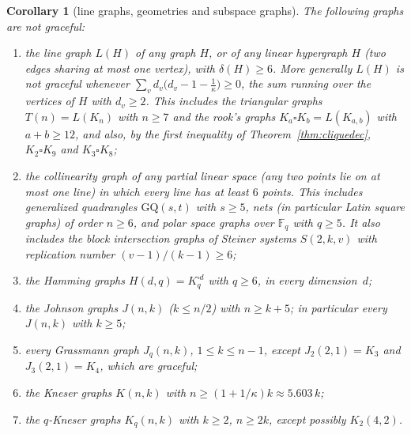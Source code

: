 \documentclass[11pt]{amsart}
\newcommand{\thmmarker}{}
\newcommand{\mnew}{\gdef\thmmarker{\textsuperscript{$\star$}}}
\theoremstyle{tplain}
\newtheorem{corollary}[theorem]{Corollary}
\theoremstyle{tdefinition}
\theoremstyle{tremark}
\begin{document}
\mnew\begin{corollary}[line graphs, geometries and subspace graphs]\label{cor:drg}
The following graphs are not graceful:
\begin{enumerate}[label=(\alph*)]
\item the line graph $L(H)$ of any graph $H$, or of any linear hypergraph $H$
  (two edges sharing at most one vertex), with $\delta(H)\ge6$. More generally
  $L(H)$ is not graceful whenever $\sum_vd_v\bigl(d_v-1-\frac1\kappa\bigr)\ge0$,
  the sum running over the vertices of $H$ with $d_v\ge2$.
  This includes the triangular graphs $T(n)=L(K_n)$ with $n\ge7$ and the rook's
  graphs $K_a\square K_b=L(K_{a,b})$ with $a+b\ge12$, and also, by the first
  inequality of Theorem~\ref{thm:cliquedec}, $K_2\square K_9$ and
  $K_3\square K_8$;
\item the collinearity graph of any partial linear space (any two points lie on
  at most one line) in which every line has at least $6$ points. This includes
  generalized quadrangles $\mathrm{GQ}(s,t)$ with $s\ge5$, nets (in particular
  Latin square graphs) of order $n\ge6$, and polar space graphs over
  $\mathbb F_q$ with $q\ge5$. It also includes the block intersection graphs
  of Steiner systems $S(2,k,v)$ with replication number $(v-1)/(k-1)\ge6$;
\item the Hamming graphs $H(d,q)=K_q^{\square d}$ with $q\ge6$, in every
  dimension~$d$;
\item the Johnson graphs $J(n,k)$ ($k\le n/2$) with $n\ge k+5$; in particular
  every $J(n,k)$ with $k\ge5$;
\item every Grassmann graph $J_q(n,k)$, $1\le k\le n-1$, except
  $J_2(2,1)=K_3$ and $J_3(2,1)=K_4$, which are graceful;
\item the Kneser graphs $K(n,k)$ with $n\ge(1+1/\kappa)k\approx5.603\,k$;
\item the $q$-Kneser graphs $K_q(n,k)$ with $k\ge2$, $n\ge2k$, except possibly
  $K_2(4,2)$.
\end{enumerate}
\end{corollary}
\end{document}
